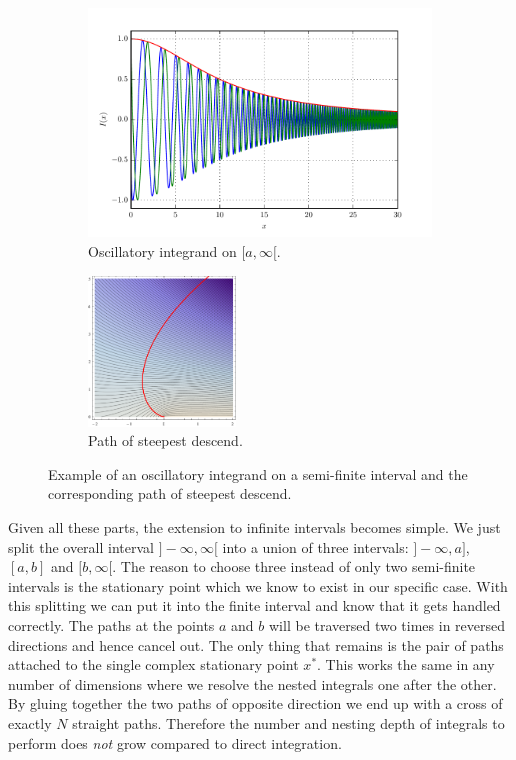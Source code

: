 \documentclass[a4paper,10pt]{article}
\begin{document}
\begin{figure}[h!]
  \begin{subfigure}[t]{0.5\linewidth}
    \centering
    \includegraphics[width=\linewidth]{./fig/oscillatory_example_semiopen.pdf}
    \caption{Oscillatory integrand on $[a, \infty[$.}
    \label{fig:oscillatory_example_semiopen_integrand}
  \end{subfigure}
  \begin{subfigure}[t]{0.5\linewidth}
    \centering
    \includegraphics[height=4cm]{./fig/oscillatory_example_semiopen_path.pdf}
    \caption{Path of steepest descend.}
    \label{fig:oscillatory_example_semiopen_path}
  \end{subfigure}
  \caption{\label{fig:oscillatory_example_semiopen}
  Example of an oscillatory integrand on a semi-finite interval and the
  corresponding path of steepest descend.}
\end{figure}

Given all these parts, the extension to infinite intervals becomes simple.
We just split the overall interval $]-\infty, \infty[$ into a union of three
intervals: $]-\infty, a]$, $[a,b]$ and $[b,\infty[$. The reason to choose three
instead of only two semi-finite intervals is the stationary point which we know
to exist in our specific case. With this splitting we can put it into the finite
interval and know that it gets handled correctly. The paths at the points
$a$ and $b$ will be traversed two times in reversed directions and hence cancel out.
The only thing that remains is the pair of paths attached to the single complex stationary
point $x^{*}$. This works the same in any number of dimensions where we resolve the nested
integrals one after the other. By gluing together the two paths of opposite direction
we end up with a cross of exactly $N$ straight paths. Therefore the number and nesting
depth of integrals to perform does \emph{not} grow compared to direct integration.
\end{document}
